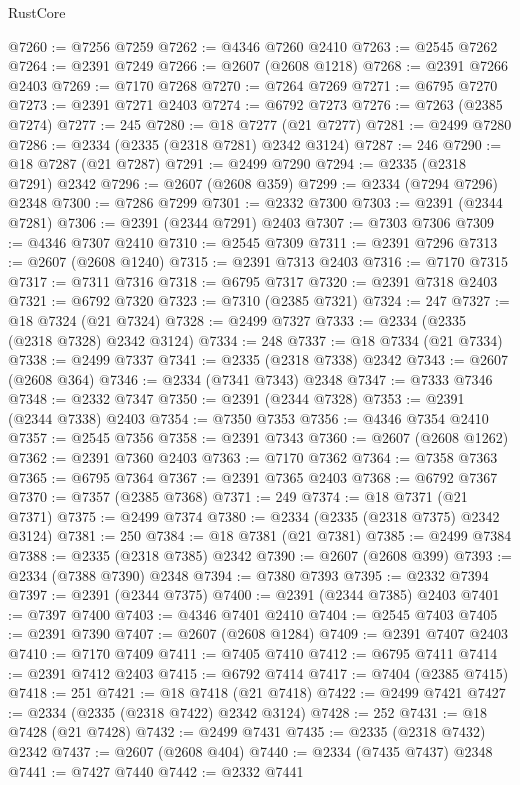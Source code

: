 \begin{lexlean}{RustCore}
\begin{coremodule}
@7260 := @7256 @7259
@7262 := @4346 @7260 @2410
@7263 := @2545 @7262
@7264 := @2391 @7249
@7266 := @2607 (@2608 @1218)
@7268 := @2391 @7266 @2403
@7269 := @7170 @7268
@7270 := @7264 @7269
@7271 := @6795 @7270
@7273 := @2391 @7271 @2403
@7274 := @6792 @7273
@7276 := @7263 (@2385 @7274)
@7277 := 245
@7280 := @18 @7277 (@21 @7277)
@7281 := @2499 @7280
@7286 := @2334 (@2335 (@2318 @7281) @2342 @3124)
@7287 := 246
@7290 := @18 @7287 (@21 @7287)
@7291 := @2499 @7290
@7294 := @2335 (@2318 @7291) @2342
@7296 := @2607 (@2608 @359)
@7299 := @2334 (@7294 @7296) @2348
@7300 := @7286 @7299
@7301 := @2332 @7300
@7303 := @2391 (@2344 @7281)
@7306 := @2391 (@2344 @7291) @2403
@7307 := @7303 @7306
@7309 := @4346 @7307 @2410
@7310 := @2545 @7309
@7311 := @2391 @7296
@7313 := @2607 (@2608 @1240)
@7315 := @2391 @7313 @2403
@7316 := @7170 @7315
@7317 := @7311 @7316
@7318 := @6795 @7317
@7320 := @2391 @7318 @2403
@7321 := @6792 @7320
@7323 := @7310 (@2385 @7321)
@7324 := 247
@7327 := @18 @7324 (@21 @7324)
@7328 := @2499 @7327
@7333 := @2334 (@2335 (@2318 @7328) @2342 @3124)
@7334 := 248
@7337 := @18 @7334 (@21 @7334)
@7338 := @2499 @7337
@7341 := @2335 (@2318 @7338) @2342
@7343 := @2607 (@2608 @364)
@7346 := @2334 (@7341 @7343) @2348
@7347 := @7333 @7346
@7348 := @2332 @7347
@7350 := @2391 (@2344 @7328)
@7353 := @2391 (@2344 @7338) @2403
@7354 := @7350 @7353
@7356 := @4346 @7354 @2410
@7357 := @2545 @7356
@7358 := @2391 @7343
@7360 := @2607 (@2608 @1262)
@7362 := @2391 @7360 @2403
@7363 := @7170 @7362
@7364 := @7358 @7363
@7365 := @6795 @7364
@7367 := @2391 @7365 @2403
@7368 := @6792 @7367
@7370 := @7357 (@2385 @7368)
@7371 := 249
@7374 := @18 @7371 (@21 @7371)
@7375 := @2499 @7374
@7380 := @2334 (@2335 (@2318 @7375) @2342 @3124)
@7381 := 250
@7384 := @18 @7381 (@21 @7381)
@7385 := @2499 @7384
@7388 := @2335 (@2318 @7385) @2342
@7390 := @2607 (@2608 @399)
@7393 := @2334 (@7388 @7390) @2348
@7394 := @7380 @7393
@7395 := @2332 @7394
@7397 := @2391 (@2344 @7375)
@7400 := @2391 (@2344 @7385) @2403
@7401 := @7397 @7400
@7403 := @4346 @7401 @2410
@7404 := @2545 @7403
@7405 := @2391 @7390
@7407 := @2607 (@2608 @1284)
@7409 := @2391 @7407 @2403
@7410 := @7170 @7409
@7411 := @7405 @7410
@7412 := @6795 @7411
@7414 := @2391 @7412 @2403
@7415 := @6792 @7414
@7417 := @7404 (@2385 @7415)
@7418 := 251
@7421 := @18 @7418 (@21 @7418)
@7422 := @2499 @7421
@7427 := @2334 (@2335 (@2318 @7422) @2342 @3124)
@7428 := 252
@7431 := @18 @7428 (@21 @7428)
@7432 := @2499 @7431
@7435 := @2335 (@2318 @7432) @2342
@7437 := @2607 (@2608 @404)
@7440 := @2334 (@7435 @7437) @2348
@7441 := @7427 @7440
@7442 := @2332 @7441

\end{coremodule}
\end{lexlean}
